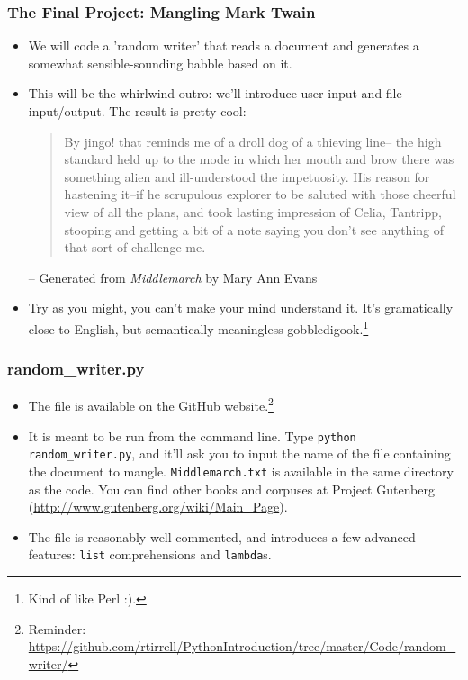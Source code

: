 \documentclass[10pt]{beamer}
\begin{document}
\begin{frame}
  \frametitle{The Final Project: Mangling Mark Twain}
  \begin{itemize}
    \item We will code a 'random writer' that reads a document and generates a somewhat sensible-sounding babble based on it.
    \item This will be the whirlwind outro: we'll introduce user input and file input/output.
      The result is pretty cool: \\
      \begin{quote}
        \small
        By jingo! that reminds me of a droll dog of a thieving line-- the high standard held up to the mode in which her mouth and brow there was something alien and ill-understood the impetuosity.  
        His reason for hastening it--if he scrupulous explorer to be saluted with those cheerful view of all the plans, and took lasting impression of Celia, Tantripp, stooping and getting a bit of a note saying you don't see anything of that sort of challenge me.
      \end{quote}
      \begin{flushright}
        \footnotesize -- Generated from \emph{Middlemarch} by Mary Ann Evans
      \end{flushright}
      \item Try as you might, you can't make your mind understand it.
        It's gramatically close to English, but semantically meaningless gobbledigook.\footnote{Kind of like Perl :).}
  \end{itemize}
\end{frame}

\begin{frame}
  \frametitle{random\_writer.py}
  \begin{itemize}
    \item The file is available on the GitHub website.\footnote{Reminder: \href{https://github.com/rtirrell/PythonIntroduction/tree/master/Code/random\_writer/}{https://github.com/rtirrell/PythonIntroduction/tree/master/Code/random\_writer/}}
    \item It is meant to be run from the command line.
      Type \texttt{python random\_writer.py}, and it'll ask you to input the name of the file containing the document to mangle.
      \texttt{Middlemarch.txt} is available in the same directory as the code.
      You can find other books and corpuses at Project Gutenberg (\href{http://www.gutenberg.org/wiki/Main\_Page}{http://www.gutenberg.org/wiki/Main\_Page}).
    \item The file is reasonably well-commented, and introduces a few advanced features: \texttt{list} comprehensions and \texttt{lambda}s.
  \end{itemize}
\end{frame}
\end{document}
